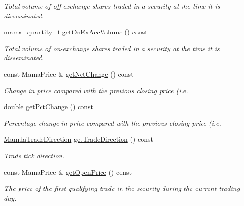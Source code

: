\begin{CompactItemize}
\begin{CompactList}\small\item\em Total volume of off-exchange shares traded in a security at the time it is disseminated. \item\end{CompactList}\item 
mama\_\-quantity\_\-t \hyperlink{classWombat_1_1MamdaTradeListener_5de3d861733f64d1a4b941c32cd1bb4b}{get\-On\-Ex\-Acc\-Volume} () const 
\begin{CompactList}\small\item\em Total volume of on-exchange shares traded in a security at the time it is disseminated. \item\end{CompactList}\item 
const Mama\-Price \& \hyperlink{classWombat_1_1MamdaTradeListener_f9dc99814388d51987fa19c1b13ff07d}{get\-Net\-Change} () const 
\begin{CompactList}\small\item\em Change in price compared with the previous closing price (i.e. \item\end{CompactList}\item 
double \hyperlink{classWombat_1_1MamdaTradeListener_a1d7053dbff245beccdd8357c72d662c}{get\-Pct\-Change} () const 
\begin{CompactList}\small\item\em Percentage change in price compared with the previous closing price (i.e. \item\end{CompactList}\item 
\hyperlink{namespaceWombat_d2479765bb418204c8ccfd3785d2bdbe}{Mamda\-Trade\-Direction} \hyperlink{classWombat_1_1MamdaTradeListener_1acaaeffe975eb7f5a9541703ca49f7e}{get\-Trade\-Direction} () const 
\begin{CompactList}\small\item\em Trade tick direction. \item\end{CompactList}\item 
const Mama\-Price \& \hyperlink{classWombat_1_1MamdaTradeListener_0960023261509bd4192432edb22059c2}{get\-Open\-Price} () const 
\begin{CompactList}\small\item\em The price of the first qualifying trade in the security during the current trading day. \item\end{CompactList}\item 

\end{CompactItemize}
